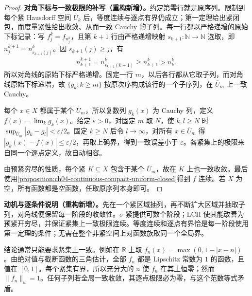 \documentclass[../../main.tex]{subfiles}%
\begin{document}
\begin{proof}
\textbf{对角下标与一致极限的补写（重构新增）。}约定第零行就是原序列。限制到每个紧 Hausdorff 空间 $\overline U_k$ 后，等度连续与逐点有界仍成立；第一定理给出紧闭包，而度量紧性给出收敛、从而一致 Cauchy 的子列。每一行都以严格递增的原始下标记录：写 $f_j^k=f_{n_j^k}$，且第 $k+1$ 行由严格递增映射 $s_{k+1}:\mathbb N\to\mathbb N$ 选取，即 $n_j^{k+1}=n_{s_{k+1}(j)}^k$。因 $s_{k+1}(j)\ge j$，有
\begin{align*}
n_{k+1}^{k+1}=n_{s_{k+1}(k+1)}^k\ge n_{k+1}^k>n_k^k.
\end{align*}
所以对角线的原始下标严格递增。固定一行 $m$，以后各行都从它取子列，而对角线原始下标递增，故 $\{g_k:k\ge m\}$ 按原次序构成该行的一个子序列，在 $\overline U_m$ 上一致 Cauchy。

每个 $x\in X$ 都属于某个 $\overline U_m$，所以复数列 $g_k(x)$ 为 Cauchy 列，定义 $f(x)=\lim_k g_k(x)$。给定 $\varepsilon>0$，对固定 $m$ 取 $N$，使 $k,l\ge N$ 时 $\sup_{\overline U_m}|g_k-g_l|<\varepsilon/2$。固定 $k\ge N$ 后令 $l\to\infty$，对所有 $x\in\overline U_m$ 得 $|g_k(x)-f(x)|\le\varepsilon/2$，再取上确界，得到一致误差小于 $\varepsilon$。各紧集上的极限来自同一个逐点定义，故自动相容。

由预紧穷尽的性质，每个紧 $K\subseteq X$ 包含于某个 $\overline U_m$，故在 $K$ 上也一致收敛。最后使用\cref{proposition:ch04-continuous-compact-uniform-closed}得到 $f$ 连续。若 $X$ 为空，所有函数都是空函数，任取原序列本身即可。
\end{proof}
\begin{remark}
\textbf{动机与逐条件说明（重构新增）。}先在一个紧区域抽列，再不断扩大区域并抽取子列，对角线便保留每一阶段的收敛性。$\sigma$-紧提供可数个阶段；LCH 使其能改善为预紧开穷尽，并保证紧集上一致极限连续。等度连续和逐点有界恰是每一阶段使用第一定理的条件；无需在整个非紧空间上对函数族取同一个全局界。

结论通常只能要求紧集上一致。例如在 $\mathbb R$ 上取 $f_n(x)=\max(0,1-|x-n|)$。由绝对值与截断函数的三角估计，全部 $f_n$ 都是 Lipschitz 常数为 $1$ 的函数，且值在 $[0,1]$。每个紧集有界，所以充分大的 $n$ 使 $f_n$ 在其上恒零；然而 $\|f_n\|_u=1$。任何子列若全局一致收敛，其逐点极限必为零，与这个范数等式矛盾。
\end{remark}
\end{document}
